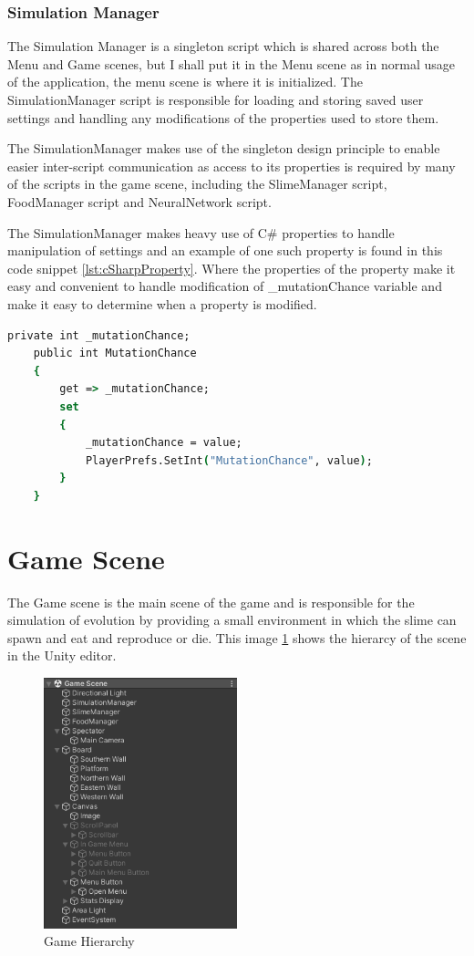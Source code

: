 \subsubsection{Simulation Manager}
The Simulation Manager is a singleton script which is shared across both the Menu and Game scenes, but I shall put it in the Menu scene as in normal usage of the application, the menu scene is where it is initialized. The SimulationManager script is responsible for loading and storing saved user settings and handling any modifications of the properties used to store them.
\par
The SimulationManager makes use of the singleton design principle to enable easier inter-script communication as access to its properties is required by many of the scripts in the game scene, including the SlimeManager script, FoodManager script and NeuralNetwork script.
\par
The SimulationManager makes heavy use of C\# properties to handle manipulation of settings and an example of one such property is found in this code snippet \ref{lst:cSharpProperty}. Where the properties of the property make it easy and convenient to handle modification of \_mutationChance variable and make it easy to determine when a property is modified.
\begin{lstlisting}[language=csh, caption=C\# Property, label={lst:cSharpProperty}]
    private int _mutationChance;
    public int MutationChance
    {
        get => _mutationChance;
        set
        {
            _mutationChance = value;
            PlayerPrefs.SetInt("MutationChance", value);
        }
    }
\end{lstlisting}
\section{Game Scene}
The Game scene is the main scene of the game and is responsible for the simulation of evolution by providing a small environment in which the slime can spawn and eat and reproduce or die. This image \ref{image:gameHierarchy} shows the hierarcy of the scene in the Unity editor.
\begin{figure}[ht!]
    \includegraphics[width=0.5\textwidth]{images/GameSceneHierarchy.png}
    \caption{Game Hierarchy}
    \label{image:gameHierarchy}
\end{figure}
